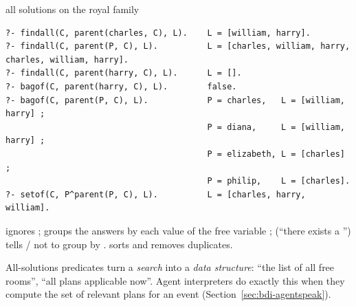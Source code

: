 \begin{nbexample}{all solutions on the royal family}
\notinslides
\begin{verbatim}
?- findall(C, parent(charles, C), L).    L = [william, harry].
?- findall(C, parent(P, C), L).          L = [charles, william, harry, charles, william, harry].
?- findall(C, parent(harry, C), L).      L = [].
?- bagof(C, parent(harry, C), L).        false.
?- bagof(C, parent(P, C), L).            P = charles,   L = [william, harry] ;
                                         P = diana,     L = [william, harry] ;
                                         P = elizabeth, L = [charles] ;
                                         P = philip,    L = [charles].
?- setof(C, P^parent(P, C), L).          L = [charles, harry, william].
\end{verbatim}
 ignores ;  groups the answers by each value of the free
variable ;  (``there exists a '') tells
/ not to group by .  sorts and removes duplicates.
\end{nbexample}

\begin{nbwhy}
\notinslides
All-solutions predicates turn a \emph{search} into a \emph{data structure}: ``the list of all
free rooms'', ``all plans applicable now''. Agent interpreters do exactly this when they
compute the set of relevant plans for an event (Section~\ref{sec:bdi-agentspeak}).
\end{nbwhy}
